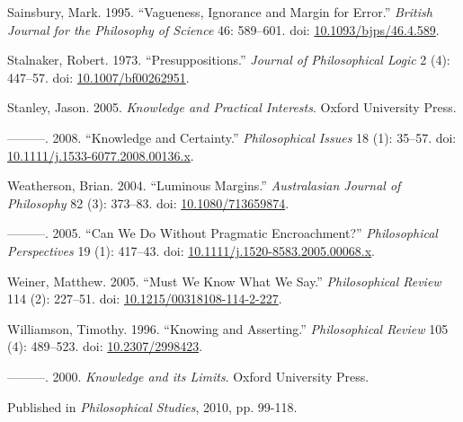 \documentclass[
  11pt,
  letterpaper,
  DIV=11,
  numbers=noendperiod,
  twoside]{scrartcl}
\newlength{\cslhangindent}
\newenvironment{CSLReferences}[2] %
 {\begin{list}{}{%
  \setlength{\itemindent}{0pt}
  \setlength{\leftmargin}{0pt}
  \setlength{\parsep}{0pt}
  \ifodd #1
   \setlength{\leftmargin}{\cslhangindent}
   \setlength{\itemindent}{-1\cslhangindent}
  \fi
  \setlength{\itemsep}{#2\baselineskip}}}
 {\end{list}}
\begin{document}
\begin{CSLReferences}{1}{0}
Sainsbury, Mark. 1995. {``Vagueness, Ignorance and Margin for Error.''}
\emph{British Journal for the Philosophy of Science} 46: 589--601. doi:
\href{https://doi.org/10.1093/bjps/46.4.589}{10.1093/bjps/46.4.589}.

Stalnaker, Robert. 1973. {``{Presuppositions}.''} \emph{Journal of
Philosophical Logic} 2 (4): 447--57. doi:
\href{https://doi.org/10.1007/bf00262951}{10.1007/bf00262951}.

Stanley, Jason. 2005. \emph{{Knowledge and Practical Interests}}. Oxford
University Press.

---------. 2008. {``{Knowledge and Certainty}.''} \emph{Philosophical
Issues} 18 (1): 35--57. doi:
\href{https://doi.org/10.1111/j.1533-6077.2008.00136.x}{10.1111/j.1533-6077.2008.00136.x}.

Weatherson, Brian. 2004. {``Luminous Margins.''} \emph{Australasian
Journal of Philosophy} 82 (3): 373--83. doi:
\href{https://doi.org/10.1080/713659874}{10.1080/713659874}.

---------. 2005. {``{Can We Do Without Pragmatic Encroachment?}''}
\emph{Philosophical Perspectives} 19 (1): 417--43. doi:
\href{https://doi.org/10.1111/j.1520-8583.2005.00068.x}{10.1111/j.1520-8583.2005.00068.x}.

Weiner, Matthew. 2005. {``Must We Know What We Say.''}
\emph{Philosophical Review} 114 (2): 227--51. doi:
\href{https://doi.org/10.1215/00318108-114-2-227}{10.1215/00318108-114-2-227}.

Williamson, Timothy. 1996. {``{Knowing and Asserting}.''}
\emph{Philosophical Review} 105 (4): 489--523. doi:
\href{https://doi.org/10.2307/2998423}{10.2307/2998423}.

---------. 2000. \emph{{Knowledge and its Limits}}. Oxford University
Press.

\end{CSLReferences}



\noindent Published in\emph{
Philosophical Studies}, 2010, pp. 99-118.
\end{document}

